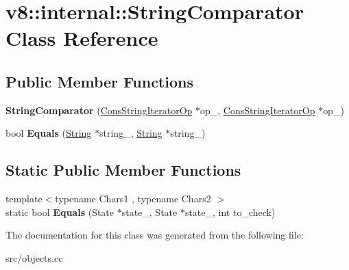 \hypertarget{classv8_1_1internal_1_1_string_comparator}{}\section{v8\+:\+:internal\+:\+:String\+Comparator Class Reference}
\label{classv8_1_1internal_1_1_string_comparator}
\subsection*{Public Member Functions}
\begin{DoxyCompactItemize}
\item 
\hypertarget{classv8_1_1internal_1_1_string_comparator_af1a169f460063b16731621705534fd20}{}{\bfseries String\+Comparator} (\hyperlink{classv8_1_1internal_1_1_cons_string_iterator_op}{Cons\+String\+Iterator\+Op} $\ast$op\+\_, \hyperlink{classv8_1_1internal_1_1_cons_string_iterator_op}{Cons\+String\+Iterator\+Op} $\ast$op\+\_)\label{classv8_1_1internal_1_1_string_comparator_af1a169f460063b16731621705534fd20}

\item 
\hypertarget{classv8_1_1internal_1_1_string_comparator_ad8ae1c583ecb97c39c86a7581ad1dbab}{}bool {\bfseries Equals} (\hyperlink{classv8_1_1internal_1_1_string}{String} $\ast$string\+\_, \hyperlink{classv8_1_1internal_1_1_string}{String} $\ast$string\+\_)\label{classv8_1_1internal_1_1_string_comparator_ad8ae1c583ecb97c39c86a7581ad1dbab}

\end{DoxyCompactItemize}
\subsection*{Static Public Member Functions}
\begin{DoxyCompactItemize}
\item 
\hypertarget{classv8_1_1internal_1_1_string_comparator_a461c33dfaa39d470b8f1efcde929c6c3}{}{\footnotesize template$<$typename Chars1 , typename Chars2 $>$ }\\static bool {\bfseries Equals} (State $\ast$state\+\_, State $\ast$state\+\_, int to\+\_\+check)\label{classv8_1_1internal_1_1_string_comparator_a461c33dfaa39d470b8f1efcde929c6c3}

\end{DoxyCompactItemize}


The documentation for this class was generated from the following file\+:\begin{DoxyCompactItemize}
\item 
src/objects.\+cc\end{DoxyCompactItemize}
